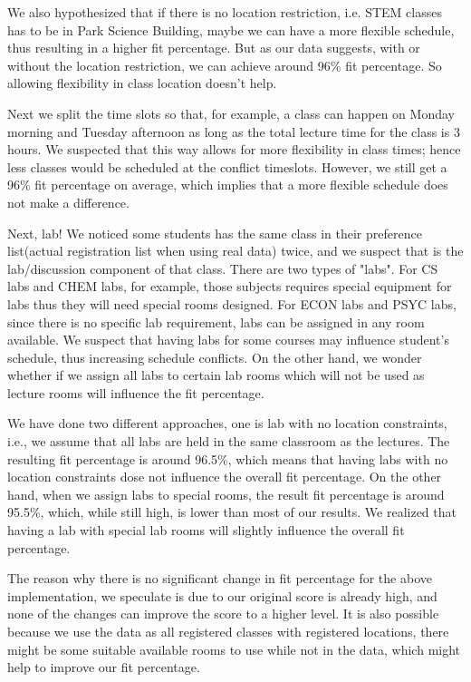 \documentclass[11pt, oneside]{article}   	%
\begin{document}
We also hypothesized that if there is no location restriction, i.e. STEM classes has to be in Park Science Building, maybe we can have a more flexible schedule, thus resulting in a higher fit percentage. But as our data suggests, with or without the location restriction, we can achieve around 96\% fit percentage. So allowing flexibility in class location doesn't help.

Next we split the time slots so that, for example, a class can happen on Monday morning and Tuesday afternoon as long as the total lecture time for the class is 3 hours. We suspected that this way allows for more flexibility in class times; hence less classes would be scheduled at the conflict timeslots. However, we still get a 96\% fit percentage on average, which implies that a more flexible schedule does not make a difference.

Next, lab! We noticed some students has the same class in their preference list(actual registration list when using real data) twice, and we suspect that is the lab/discussion component of that class. There are two types of "labs". For CS labs and CHEM labs, for example, those subjects requires special equipment for labs thus they will need special rooms designed. For ECON labs and PSYC labs, since there is no specific lab requirement, labs can be assigned in any room available. We suspect that having labs for some courses may influence student's schedule, thus increasing schedule conflicts. On the other hand, we wonder whether if we assign all labs to certain lab rooms which will not be used as lecture rooms will influence the fit percentage. 

We have done two different approaches, one is lab with no location constraints, i.e., we assume that all labs are held in the same classroom as the lectures. The resulting fit percentage is around 96.5\%, which means that having labs with no location constraints  dose not influence the overall fit percentage. On the other hand, when we assign labs to special rooms, the result fit percentage is around 95.5\%, which, while still high, is lower than most of our results. We realized that having a lab with special lab rooms will slightly influence the overall fit percentage.

The reason why there is no significant change in fit percentage for the above implementation, we speculate is due to our original score is already high, and none of the changes can improve the score to a higher level. It is also possible because we use the data as all registered classes with registered locations, there might be some suitable available rooms to use while not in the data, which might help to improve our fit percentage.
\end{document}
